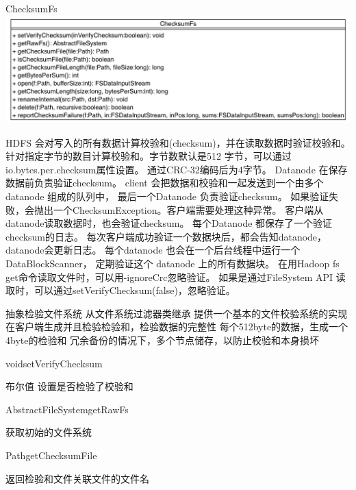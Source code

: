 \begin{XeClass}{ChecksumFs}
\includegraphics[width=\textwidth]{cdig/ChecksumFs.png}
     
 HDFS 会对写入的所有数据计算校验和(checksum)，并在读取数据时验证校验和。
 针对指定字节的数目计算校验和。字节数默认是512 字节，可以通过io.bytes.per.checksum属性设置。
 通过CRC-32编码后为4字节。
 Datanode 在保存数据前负责验证checksum。
 client 会把数据和校验和一起发送到一个由多个datanode 组成的队列中，
 最后一个Datanode 负责验证checksum。
 如果验证失败，会抛出一个ChecksumException。客户端需要处理这种异常。
 客户端从datanode读取数据时，也会验证checksum。
 每个Datanode 都保存了一个验证checksum的日志。
 每次客户端成功验证一个数据块后，都会告知datanode，datanode会更新日志。
 每个datanode 也会在一个后台线程中运行一个DataBlockScanner，
 定期验证这个 datanode 上的所有数据块。
 在用Hadoop fs get命令读取文件时，可以用-ignoreCrc忽略验证。
 如果是通过FileSystem API 读取时，可以通过setVerifyChecksum(false)，忽略验证。
 
 抽象检验文件系统 从文件系统过滤器类继承
 提供一个基本的文件校验系统的实现
 在客户端生成并且检验检验和，检验数据的完整性
 每个512byte的数据，生成一个4byte的检验和
 冗余备份的情况下，多个节点储存，以防止校验和本身损坏

    \begin{XeMethod}{\XePublic}{void}{setVerifyChecksum}
         
 布尔值 设置是否检验了校验和

    \end{XeMethod}

    \begin{XeMethod}{\XePublic}{AbstractFileSystem}{getRawFs}
         
 获取初始的文件系统

    \end{XeMethod}

    \begin{XeMethod}{\XePublic}{Path}{getChecksumFile}
         
 返回检验和文件关联文件的文件名

    \end{XeMethod}


\end{XeClass}
